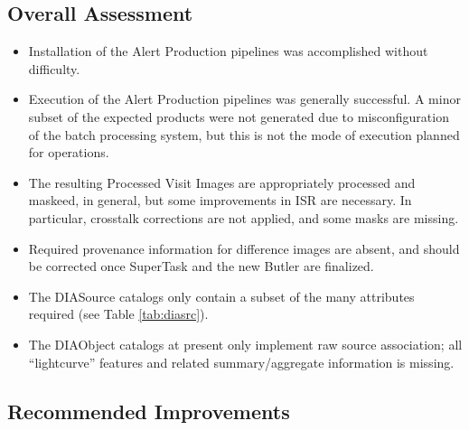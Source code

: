 \documentclass[DM,lsstdraft,STR,toc]{lsstdoc}
\begin{document}
\subsection{Overall Assessment \label{sect:overallassessment}}
\begin{itemize}
	\item Installation of the Alert Production pipelines was accomplished without difficulty.
\item Execution of the Alert Production pipelines was generally successful.  
A minor subset of the expected products were not generated due to misconfiguration of the batch processing system, but this is not the mode of execution planned for operations.
\item The resulting Processed Visit Images are appropriately processed and maskeed, in general, but some improvements in ISR are necessary.  In particular, crosstalk corrections are not applied, and some masks are missing.
\item Required provenance information for difference images are absent, and should be corrected once SuperTask and the new Butler are finalized.
\item The DIASource catalogs only contain a subset of the many attributes required (see Table \ref{tab:diasrc}).
\item The DIAObject catalogs at present only implement raw source association; all ``lightcurve'' features and related summary/aggregate information is missing.
\end{itemize}


\subsection{Recommended Improvements}
\label{sect:recommendations}
\end{document}
